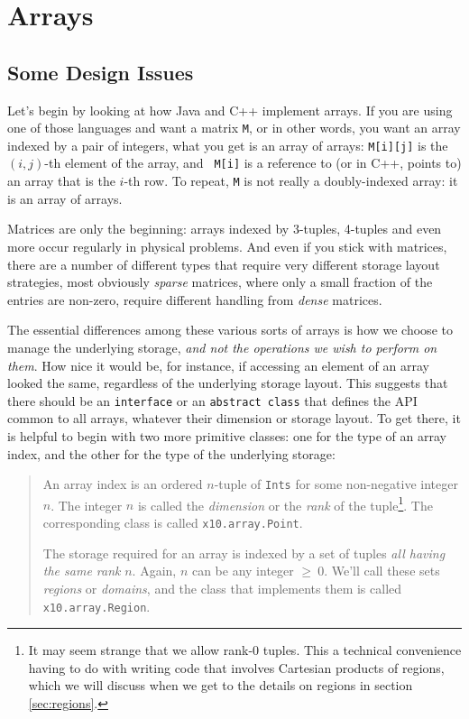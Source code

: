 \chapter{Arrays}
\section{Some Design Issues}
Let's begin by looking at how Java and C++ implement arrays.  If you
are using one of those languages and want a matrix {\tt M}, or in other
words, you want an array indexed by a pair of integers, what you get is an
array of arrays: {\tt M[i][j]} is the $(i,j)$-th element of the array, and {\tt
M[i]} is a reference to (or in C++, points to) an array that is the $i$-th row.
To repeat, {\tt M} is not really a doubly-indexed array: it is an array of
arrays.

Matrices are only the beginning: arrays indexed by 3-tuples,
4-tuples and even more occur regularly in physical problems.  And even if you
stick with matrices, there are a number of different types that require very
different storage layout strategies, most obviously {\em sparse} matrices, where
only a small fraction of the entries are non-zero, require  different
handling from {\em dense} matrices.

The essential differences among these various sorts of arrays is how we choose
to manage the underlying storage, {\em and not the operations we wish to perform
on them}. How nice it would be, for instance, if accessing an element of an
array looked the same, regardless of the underlying storage layout. This
suggests that there should be an {\tt interface} or an {\tt abstract class} 
that defines the API common to all arrays, whatever their dimension or storage
layout. To get there, it is helpful to begin with two more primitive classes:
one for the type of an array index, and the other for the type of the underlying
storage:
\begin{quote}
An array index is an ordered $n$-tuple of {\tt Ints} for some non-negative
integer $n$.  The integer $n$ is called the {\em dimension} or the {\em
rank} of the tuple\footnote{It may seem strange that we allow rank-0 tuples.
This a technical convenience having to do with writing code that involves
Cartesian products of regions, which we will discuss when we get to the details
on regions in section \ref{sec:regions}.}. The corresponding \Xten{} class is
called {\tt x10.array.Point}.

The storage required for an array is indexed by a set of tuples {\em all
having the same rank} $n$.  Again, $n$ can be any integer $\ge\  0$.  We'll call
these sets {\em regions} or {\em domains}, and the \Xten{} class that implements
them is called {\tt x10.array.Region}.

\end{quote}

